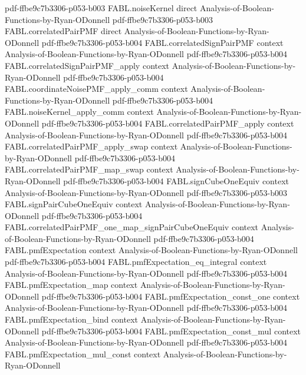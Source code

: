 \begin{theorem}
  {pdf-ffbe9c7b3306-p053-b003}
\proofstep
  {FABL.noiseKernel}
  {direct}
  {Analysis-of-Boolean-Functions-by-Ryan-ODonnell}
  {pdf-ffbe9c7b3306-p053-b003}
\proofstep
  {FABL.correlatedPairPMF}
  {direct}
  {Analysis-of-Boolean-Functions-by-Ryan-ODonnell}
  {pdf-ffbe9c7b3306-p053-b004}
\proofstep
  {FABL.correlatedSignPairPMF}
  {context}
  {Analysis-of-Boolean-Functions-by-Ryan-ODonnell}
  {pdf-ffbe9c7b3306-p053-b004}
\proofstep
  {FABL.correlatedSignPairPMF_apply}
  {context}
  {Analysis-of-Boolean-Functions-by-Ryan-ODonnell}
  {pdf-ffbe9c7b3306-p053-b004}
\proofstep
  {FABL.coordinateNoisePMF_apply_comm}
  {context}
  {Analysis-of-Boolean-Functions-by-Ryan-ODonnell}
  {pdf-ffbe9c7b3306-p053-b004}
\proofstep
  {FABL.noiseKernel_apply_comm}
  {context}
  {Analysis-of-Boolean-Functions-by-Ryan-ODonnell}
  {pdf-ffbe9c7b3306-p053-b004}
\proofstep
  {FABL.correlatedPairPMF_apply}
  {context}
  {Analysis-of-Boolean-Functions-by-Ryan-ODonnell}
  {pdf-ffbe9c7b3306-p053-b004}
\proofstep
  {FABL.correlatedPairPMF_apply_swap}
  {context}
  {Analysis-of-Boolean-Functions-by-Ryan-ODonnell}
  {pdf-ffbe9c7b3306-p053-b004}
\proofstep
  {FABL.correlatedPairPMF_map_swap}
  {context}
  {Analysis-of-Boolean-Functions-by-Ryan-ODonnell}
  {pdf-ffbe9c7b3306-p053-b004}
\proofstep
  {FABL.signCubeOneEquiv}
  {context}
  {Analysis-of-Boolean-Functions-by-Ryan-ODonnell}
  {pdf-ffbe9c7b3306-p053-b003}
\proofstep
  {FABL.signPairCubeOneEquiv}
  {context}
  {Analysis-of-Boolean-Functions-by-Ryan-ODonnell}
  {pdf-ffbe9c7b3306-p053-b004}
\proofstep
  {FABL.correlatedPairPMF_one_map_signPairCubeOneEquiv}
  {context}
  {Analysis-of-Boolean-Functions-by-Ryan-ODonnell}
  {pdf-ffbe9c7b3306-p053-b004}
\proofstep
  {FABL.pmfExpectation}
  {context}
  {Analysis-of-Boolean-Functions-by-Ryan-ODonnell}
  {pdf-ffbe9c7b3306-p053-b004}
\proofstep
  {FABL.pmfExpectation_eq_integral}
  {context}
  {Analysis-of-Boolean-Functions-by-Ryan-ODonnell}
  {pdf-ffbe9c7b3306-p053-b004}
\proofstep
  {FABL.pmfExpectation_map}
  {context}
  {Analysis-of-Boolean-Functions-by-Ryan-ODonnell}
  {pdf-ffbe9c7b3306-p053-b004}
\proofstep
  {FABL.pmfExpectation_const_one}
  {context}
  {Analysis-of-Boolean-Functions-by-Ryan-ODonnell}
  {pdf-ffbe9c7b3306-p053-b004}
\proofstep
  {FABL.pmfExpectation_bind}
  {context}
  {Analysis-of-Boolean-Functions-by-Ryan-ODonnell}
  {pdf-ffbe9c7b3306-p053-b004}
\proofstep
  {FABL.pmfExpectation_const_mul}
  {context}
  {Analysis-of-Boolean-Functions-by-Ryan-ODonnell}
  {pdf-ffbe9c7b3306-p053-b004}
\proofstep
  {FABL.pmfExpectation_mul_const}
  {context}
  {Analysis-of-Boolean-Functions-by-Ryan-ODonnell}

\end{theorem}

